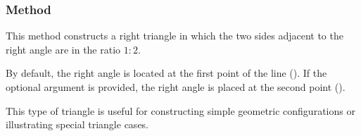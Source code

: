 \vspace{1em}
\begin{minipage}{.5\textwidth}
\begin{center}
\end{center}

\end{minipage}
\begin{minipage}{.5\textwidth}
\begin{tkzexample}
\end{tkzexample}
\end{minipage}

\subsubsection{Method }
\label{ssub:method_imeth_line_half_swap}

This method constructs a right triangle in which the two sides adjacent to the right angle are in the ratio $1:2$.

\medskip

By default, the right angle is located at the first point of the line (). If the optional argument  is provided, the right angle is placed at the second point ().

\medskip

This type of triangle is useful for constructing simple geometric configurations or illustrating special triangle cases.

